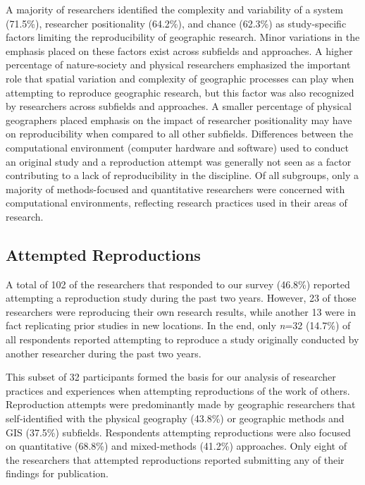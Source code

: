 \documentclass[]{interact}
\theoremstyle{plain}%
\theoremstyle{definition}
\theoremstyle{remark}
\begin{document}
A majority of researchers identified the complexity and variability of a system (71.5\%), researcher positionality (64.2\%), and chance (62.3\%) as study-specific factors limiting the reproducibility of geographic research.
Minor variations in the emphasis placed on these factors exist across subfields and approaches. 
A higher percentage of nature-society and physical researchers emphasized the important role that spatial variation and complexity of geographic processes can play when attempting to reproduce geographic research, but this factor was also recognized by researchers across subfields and approaches. 
A smaller percentage of physical geographers placed emphasis on the impact of researcher positionality may have on reproducibility when compared to all other subfields.  
Differences between the computational environment (computer hardware and software) used to conduct an original study and a reproduction attempt was generally not seen as a factor contributing to a lack of reproducibility in the discipline. 
Of all subgroups, only a majority of methods-focused and quantitative researchers were concerned with computational environments, reflecting research practices used in their areas of research.


\subsection*{Attempted Reproductions}
A total of 102 of the researchers that responded to our survey (46.8\%) reported attempting a reproduction study during the past two years.
However, 23 of those researchers were reproducing their own research results, while another 13 were in fact replicating prior studies in new locations.
In the end, only \textit{n}=32 (14.7\%) of all respondents reported attempting to reproduce a study originally conducted by another researcher during the past two years.

This subset of 32 participants formed the basis for our analysis of researcher practices and experiences when attempting reproductions of the work of others.
Reproduction attempts were predominantly made by geographic researchers that self-identified with the physical geography (43.8\%) or geographic methods and GIS (37.5\%) subfields.
Respondents attempting reproductions were also focused on quantitative (68.8\%) and mixed-methods (41.2\%) approaches. 
Only eight of the researchers that attempted reproductions reported submitting any of their findings for publication.
\end{document}
